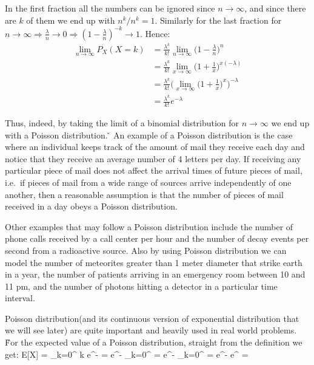 In the first fraction all the numbers can be ignored since $n \to \infty$, and since there are $k$ of them we end up
with $n^k/n^k = 1$. Similarly for the last fraction for $n \to \infty \Rightarrow \frac{\lambda}{n} \to 0 \Rightarrow
(1-\frac{\lambda}{n})^{-k} \to 1$. Hence:
{\setlength{\jot}{10pt}
\begin{align*}
\lim_{n\to\infty} P_{X}(X=k) &= \frac{\lambda^k}{k!} \lim_{n\to\infty} \Big( 1-\frac{\lambda}{n} \Big)^{n}\\
&= \frac{\lambda^k}{k!} \lim_{x\to\infty} \Big( 1+\frac{1}{x} \Big)^{x(-\lambda)} \\
&= \frac{\lambda^k}{k!} \Big(\lim_{x\to\infty} \Big(1+\frac{1}{x}\Big)^{x}\Big)^{-\lambda} \\
&= \frac{\lambda^k}{k!} e^{-\lambda}
\end{align*}}

Thus, indeed, by taking the limit of a binomial distribution for $n \to \infty$ we end up with a Poisson distribution. \v

\be
An example of a Poisson distribution is the case where an individual keeps track of the amount of mail they receive
each day and notice that they receive an average number of 4 letters per day. If receiving any particular piece of
mail does not affect the arrival times of future pieces of mail, i.e.\ if pieces of mail from a wide range of sources
arrive independently of one another, then a reasonable assumption is that the number of pieces of mail received in a
day obeys a Poisson distribution.
\ee

\be
Other examples that may follow a Poisson distribution include the number of phone calls received by a call center per
hour and the number of decay events per second from a radioactive source. Also by using Poisson distribution we can
model the number of meteorites greater than 1 meter diameter that strike earth in a year, the number of patients
arriving in an emergency room between 10 and 11 pm, and the number of photons hitting a detector in a particular time
interval.
\ee

Poisson distribution(and its continuous version of exponential distribution that we will see later) are quite
important and heavily used in real world problems. \v

For the expected value of a Poisson distribution, straight from the definition we get:
\bse
E[X] = \sum _{k=0}^{\infty} k e^{-\lambda} 
= e^{-\lambda} \sum _{k=0}^{\infty} = \lambda e^{-\lambda}
\sum _{k=0}^{\infty} = \lambda e^{-\lambda} e^{\lambda} = \lambda
\ese


